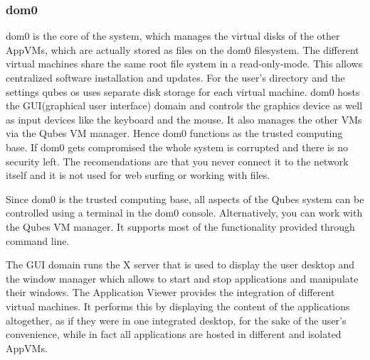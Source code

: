 \documentclass[runningheads,a4paper]{article}
\begin{document}
\subsubsection{dom0}

dom0 is the core of the system, which manages the virtual disks of the
other AppVMs, which are actually stored as files on the dom0
filesystem. The different virtual machines share the same root file
system in a read-only-mode. This allows centralized software
installation and updates. For the user's directory and the settings
qubes os uses separate disk storage for each virtual machine. 
dom0 hosts the GUI(graphical user interface) domain and controls the
graphics device as well as input devices like the keyboard and the
mouse. It also manages the other VMs via the Qubes VM manager. Hence
dom0 functions as the trusted computing base. If dom0 gets compromised
the whole system is corrupted and there is no security left. The
recomendations are that you never connect it to the network itself and
it is not used for web surfing or working with files.

Since dom0 is the trusted computing base, all aspects of the Qubes
system can be controlled using a terminal in the dom0 console. 
Alternatively, you can work with the Qubes VM
manager. It supports most of the functionality provided through
command line. 

The GUI domain runs the X server that is used to display the user desktop and
the window manager which allows to start and stop applications and
manipulate their windows. The Application Viewer provides the
integration of different virtual machines. It performs this by displaying the
content of the applications altogether, as if they were in one integrated desktop, for
the sake of the user's convenience, while in fact all applications are hosted in different and isolated AppVMs.
\end{document}
